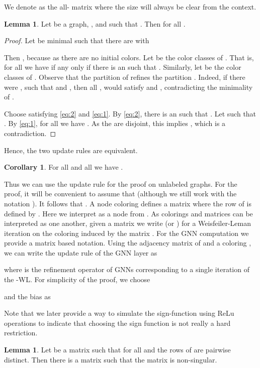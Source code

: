 \documentclass[letterpaper]{article}
\theoremstyle{definition}
\newtheorem{lemma}[theorem]{Lemma}
\newtheorem{corollary}[theorem]{Corollary}
\begin{document}
We denote  as the all- matrix where the size will always be clear from the context.

\begin{lemma}\label{lem:1}
	Let  be a graph, , and  such that
	.
	Then  for all .
\end{lemma}

\begin{proof}
	Let  be minimal such that there are  with
	
	Then , because  as there are no initial colors.
	Let  be the color classes of . That
	is, for all  we have
	 if any only if there is an
	 such that . 
	Similarly, let  be the color classes of . 
	Observe that the partition  of  refines the partition . 
	Indeed, if there were ,  such that  and , then all ,  would satisfy  and , contradicting the minimality of .
				
	Choose  satisfying \eqref{eq:2} and \eqref{eq:1}. 
	By \eqref{eq:2}, there is an  such that . 
	Let  such that . 
	By \eqref{eq:1}, for all  we have . 
	As the  are disjoint, this implies  , which is a contradiction.
\end{proof}
Hence, the two update rules are equivalent.
\begin{corollary}
	For all  and all  we have .
\end{corollary}
Thus we can use the update rule  for the proof on unlabeled graphs. For the proof, it will be convenient to 
assume that  (although we still work with the notation ). It follows that .  A node coloring  defines a matrix  where the  row of  is defined by .
Here we interpret  as a node from . As colorings and matrices can be interpreted as one another, given a matrix  we write  (or ) for a Weisfeiler-Leman iteration on the coloring  induced by the matrix . For the GNN computation we provide a matrix based notation.
Using the adjacency matrix  of  and a coloring , we can write the update rule of the GNN layer as

where  is the refinement operator of GNNs corresponding to a single iteration of the -WL. For simplicity of the proof, we choose

and the bias as 

Note that we later provide a way to simulate the sign-function using ReLu operations to indicate that choosing the sign function is not really a hard restriction.
\begin{lemma}
	\label{lem:dist2lu}
	Let  be a matrix such that 
	for all  and the rows of  are pairwise distinct. 
	Then there is a matrix  such that the matrix
	 is non-singular.
\end{lemma}
\end{document}
